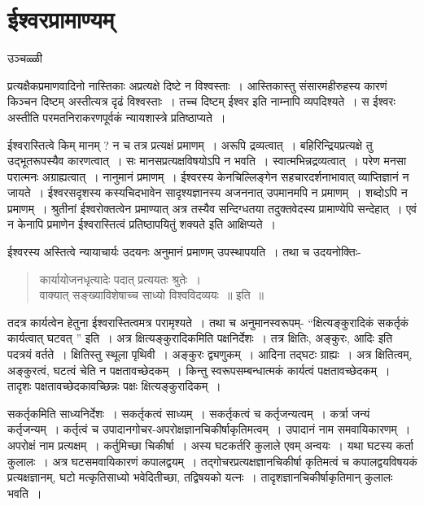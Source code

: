 {\fontsize{15}{17}\selectfont
\presetvalues
\chapter{ईश्वरप्रामाण्यम्}

\begin{center}
\smallskip
उञ्चळ्ळी
\addrule
\end{center}
प्रत्यक्षैकप्रमाणवादिनो नास्तिकाः अप्रत्यक्षे दिष्टे न विश्वस्ताः~। आस्तिकास्तु संसारमहीरुहस्य कारणं किञ्चन दिष्टम् अस्तीत्यत्र दृढं विश्वस्ताः~। तच्च दिष्टम् ईश्वर इति नाम्नापि व्यपदिश्यते~। स ईश्वरः अस्तीति परमतनिराकरणपूर्वकं न्यायशास्त्रे प्रतिष्ठाप्यते~। 

ईश्वरास्तित्वे किम् मानम् ? न च तत्र प्रत्यक्षं प्रमाणम्~। अरूपि द्रव्यत्वात्~। बहिरिन्द्रियप्रत्यक्षे तु उद्भूतरूपस्यैव कारणत्वात्~। सः मानसप्रत्यक्षविषयोऽपि न भवति~। स्वात्मभिन्नद्रव्यत्वात्~। परेण मनसा परात्मनः अग्राह्यत्वात्~। नानुमानं प्रमाणम्~। ईश्वरस्य केनचिल्लिङ्गेन सहचारदर्शनाभावात् व्याप्तिज्ञानं न जायते~। ईश्वरसदृशस्य कस्यचिदभावेन सादृश्यज्ञानस्य अजननात् उपमानमपि न प्रमाणम्~। शब्दोऽपि न प्रमाणम्~। श्रुतीनां ईश्वरोक्तत्वेन प्रमाण्यात् अत्र तस्यैव सन्दिग्धतया तदुक्तवेदस्य प्रामाण्येपि सन्देहात्~। एवं न केनापि प्रमाणेन ईश्वरास्तित्वं प्रतिष्ठापयितुं शक्यते इति आक्षिप्यते~। 

ईश्वरस्य अस्तित्वे न्यायाचार्यः उदयनः अनुमानं प्रमाणम् उपस्थापयति~। तथा च उदयनोक्तिः-
\begin{verse}
कार्यायोजनधृत्यादेः पदात् प्रत्ययतः श्रुतेः~। \\
वाक्यात् सङ्ख्याविशेषाच्च साध्यो विश्वविदव्ययः~॥ इति~॥
\end{verse}
तदत्र कार्यत्वेन हेतुना ईश्वरास्तित्वमत्र परामृश्यते~। तथा च अनुमानस्वरूपम्- “क्षित्यङ्कुरादिकं सकर्तृकं कार्यत्वात् घटवत् ” इति~। अत्र क्षित्यङ्कुरादिकमिति पक्षनिर्देशः~। तत्र क्षितिः, अङ्कुरः, आदिः इति पदत्रयं वर्तते~। क्षितिस्तु स्थूला पृथिवी~। अङ्कुरः द्व्यणुकम्~। आदिना तद्घटः ग्राह्यः~। अत्र क्षितित्वम्, अङ्कुरत्वं, घटत्वं चेति न पक्षतावच्छेदकम्~। किन्तु स्वरूपसम्बन्धात्मकं कार्यत्वं पक्षतावच्छेदकम्~। तादृशः पक्षतावच्छेदकावच्छिन्नः पक्षः क्षित्यङ्कुरादिकम्~। 

सकर्तृकमिति साध्यनिर्देशः~। सकर्तृकत्वं साध्यम्~। सकर्तृकत्वं च कर्तृजन्यत्वम्~। कर्त्रा जन्यं कर्तृजन्यम्~। कर्तृत्वं च उपादानगोचर-अपरोक्षज्ञानचिकीर्षाकृतिमत्वम्~। उपादानं नाम समवायिकारणम्~। अपरोक्षं नाम प्रत्यक्षम्~। कर्तुमिच्छा चिकीर्षा~। अस्य घटकर्तरि कुलाले एवम् अन्वयः~। यथा घटस्य कर्ता कुलालः~। अत्र घटसमवायिकारणं कपालद्वयम्~। तद्गोचरप्रत्यक्षज्ञानचिकीर्षा कृतिमत्वं च कपालद्वयविषयकं प्रत्यक्षज्ञानम्, घटो मत्कृतिसाध्यो भवेदितीच्छा, तद्विषयको यत्नः~। तादृशज्ञानचिकीर्षाकृतिमान् कुलालः भवति~। 

}
